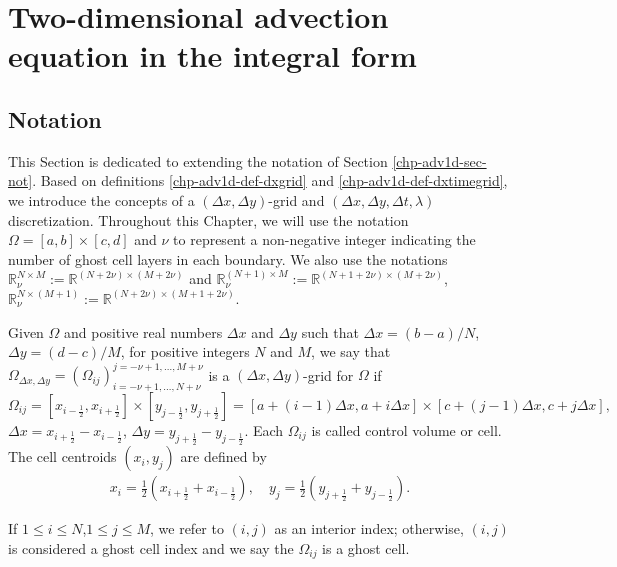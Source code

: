 \section{Two-dimensional advection equation in the integral form}
\label{sec-adv2d}
\subsection{Notation}
\label{chp-adv2d-sec-not}
This Section is dedicated to extending the notation of Section \ref{chp-adv1d-sec-not}.
Based on definitions \ref{chp-adv1d-def-dxgrid} and \ref{chp-adv1d-def-dxtimegrid},
we introduce the concepts of a $(\Delta x,\Delta y)$-grid and $(\Delta x, \Delta y, \Delta t, \lambda)$ discretization.
Throughout this Chapter, we will use the notation $\Omega=[a,b]\times[c,d]$
and $\nu$ to represent a non-negative integer indicating the number of ghost cell layers in each boundary.
We also use the notations $\mathbb{R}^{N\times M}_{\nu}:=\mathbb{R}^{(N+2\nu)\times (M+2\nu)}$ and
$\mathbb{R}^{(N+1)\times M}_{\nu}:=\mathbb{R}^{(N+1+2\nu)\times (M+2\nu)}$,
$\mathbb{R}^{N\times (M+1)}_{\nu}:=\mathbb{R}^{(N+2\nu)\times (M+1+2\nu)}$.
\begin{definition}
	\label{chp-adv1d-def-2dgrid}
	Given $\Omega$ and positive real numbers $\Delta x$ and $\Delta y$ such that $\Delta x = (b-a)/N$, 
	$\Delta y = (d-c)/M$, for positive integers $N$ and $M$,
	we say that $\Omega_{\Delta x, \Delta y}=(\Omega_{ij})_{i=-\nu+1,\ldots,N+\nu}^{j=-\nu+1,\ldots,M+\nu}$
	is a $(\Delta x, \Delta y)$-grid for $\Omega$ if
    \begin{equation*}
	\Omega_{ij} = [x_{i-\frac{1}{2}}, x_{i+\frac{1}{2}}]\times [y_{j-\frac{1}{2}}, y_{j+\frac{1}{2}}] =
    [a+(i-1)\Delta x,a+i\Delta x]\times [c+(j-1)\Delta x,c+j\Delta x],
    \end{equation*}
	$\Delta x = x_{i+\frac{1}{2}}-x_{i-\frac{1}{2}}$, $\Delta y = y_{j+\frac{1}{2}}-y_{j-\frac{1}{2}}$.
	Each $\Omega_{ij}$ is called control volume or cell.
	The cell centroids $(x_i,y_j)$ are defined by
    \begin{align*}
       x_i = \frac{1}{2}(x_{i+\frac{1}{2}} + x_{i-\frac{1}{2}}), \quad y_j = \frac{1}{2}(y_{j+\frac{1}{2}} + y_{j-\frac{1}{2}}).
    \end{align*}
\end{definition}
\begin{remark}
If $1 \leq i \leq N$,$1 \leq j \leq M$, we refer to $(i,j)$ as an interior index;
otherwise, $(i,j)$ is considered a ghost cell index and we say the $\Omega_{ij}$ is a ghost cell.
\end{remark}
